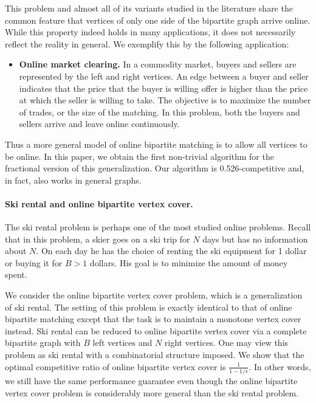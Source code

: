 \documentclass{article}
\begin{document}
This problem and almost all of its variants studied in the literature share the common feature that vertices of only one side of the bipartite graph arrive online. While this property indeed holds in many applications, it does not necessarily reflect the reality in general. We exemplify this by the following application:
\begin{itemize}

\item {\bf Online market clearing.} In a commodity market, buyers and sellers are represented by the left and right vertices. An edge between a buyer and seller indicates that the price that the buyer is willing offer is higher than the price at which the seller is willing to take. The objective is to maximize the number of trades, or the size of the matching. In this problem, both the buyers and sellers arrive and leave online continuously.

\end{itemize}
Thus a more general model of online bipartite matching is to allow all vertices to be online. In this paper, we obtain the first non-trivial algorithm for the fractional version of this generalization. Our algorithm is 0.526-competitive and, in fact, also works in general graphs.

\paragraph{Ski rental and online bipartite vertex cover.}
The ski rental problem is perhaps one of the most studied online problems. Recall that in this problem, a skier goes on a ski trip for $N$ days but has no information about $N$. On each day he has the choice of renting the ski equipment for 1 dollar or buying it for $B>1$ dollars. His goal is to minimize the amount of money spent.

We consider the online bipartite vertex cover problem, which is a generalization of ski rental. The setting of this problem is exactly identical to that of online bipartite matching except that the task is to maintain a monotone vertex cover instead. Ski rental can be reduced to online bipartite vertex cover via a complete bipartite graph with $B$ left vertices and $N$ right vertices. One may view this problem as ski rental with a combinatorial structure imposed.
We show that the optimal competitive ratio of online bipartite vertex cover is $\frac{1}{1-1/e}$. In other words, we still have the same performance guarantee even though the online bipartite vertex cover problem is considerably more general than the ski rental problem.
\end{document}
